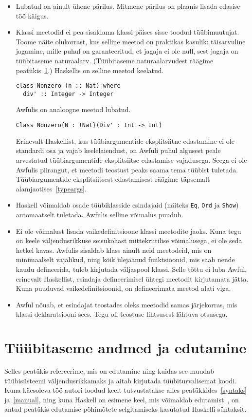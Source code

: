 \documentclass[12pt]{article}
\newcommand\peatykk[1]{
  \clearpage
  \section{#1}}
\begin{document}
      \begin{itemize}
        \item
          Lubatud on ainult ühene pärilus. Mitmene pärilus on plaanis lisada edasise töö käigus.
        \item
          Klassi meetodid ei pea sisaldama klassi päises sisse toodud tüübimuutujat. Toome näite olukorrast, kus selline meetod on praktikas kasulik: täisarvuline jagamine, mille puhul on garanteeritud, et jagaja ei ole null, sest jagaja on tüübitaseme naturaalarv. (Tüübitaseme naturaalarvudest räägime peatükis~\ref{edutamine}.) Haskellis on selline meetod keelatud.

          \begin{verbatim}class Nonzero (n :: Nat) where
  div' :: Integer -> Integer\end{verbatim}

          Awfulis on analoogne meetod lubatud.

          \begin{verbatim}Class Nonzero{N : !Nat}(Div' : Int -> Int)\end{verbatim}

          Erinevalt Haskellist, kus tüübiargumentide eksplitsiitne edastamine ei ole standardi osa ja vajab keelelaiendust, on Awfuli puhul algusest peale arvestatud tüübiargumentide eksplitsiitse edastamise vajadusega. Seega ei ole Awfulis piirangut, et meetodi teostust peaks saama tema tüübist tuletada. Tüübiargumentide eksplitsiitsest edastamisest räägime täpsemalt alamjaotises~\ref{typeargs}.
        \item
          Haskell võimaldab osade tüübiklasside esindajaid (näiteks \verb!Eq!, \verb!Ord! ja \verb!Show!) automaatselt tuletada. Awfulis selline võimalus puudub.
        \item
          Ei ole võimalust lisada vaikedefinitsioone klassi meetodite jaoks. Kuna tegu on keele väljendusrikkuse seisukohast mittekriitilise võimalusega, ei ole seda hetkel kavas. Awfulis sisaldab klass ainult neid meetodeid, mis on minimaalselt vajalikud, ning kõik ülejäänud funktsioonid, mis saab nende kaudu defineerida, tuleb kirjutada väljaspool klassi. Selle tõttu ei luba Awful, erinevalt Haskellist, esindaja defineerimisel ühtegi meetodit kirjutamata jätta. Kuna puuduvad vaikedefinitsioonid, on defineerimata meetod alati viga.
        \item
          Awful nõuab, et esindajat teostades oleks meetodid samas järjekorras, mis klassi deklaratsiooni sees. Tegu oli teostuse lihtsusest lähtuva otsusega.
      \end{itemize}
  \peatykk{Tüübitaseme andmed ja edutamine}\label{edutamine}
    Selles peatükis refereerime, mis on edutamine ning kuidas see muudab tüübisüsteemi väljendusrikkamaks ja aitab kirjutada tüübiturvalisemat koodi. Kuna käesoleva töö autori loodud keelt tutvustatakse alles peatükkides~\ref{syntaks} ja~\ref{manual}, ning kuna Haskell on esimene keel, mis võimaldab edutamist~\cite{Giv}, on antud peatükis edutamise põhimõtete selgitamiseks kasutatud Haskelli süntaksit.
\end{document}
